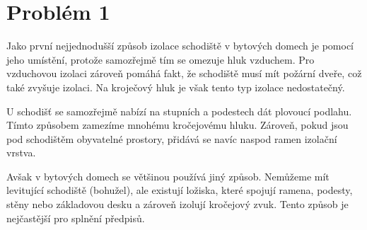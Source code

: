 \documentclass{fkssolpub}
\author{Ondřej Sedláček}
\begin{document}
 

\section{Problém 1}

Jako první nejjednodušší způsob izolace schodiště v bytových domech je
pomocí jeho umístění, protože samozřejmě tím se omezuje hluk vzduchem.
Pro vzduchovou izolaci zároveň pomáhá fakt, že schodiště musí mít
požární dveře, což také zvyšuje izolaci. Na kroječový hluk je však 
tento typ izolace nedostatečný.

U schodišť se samozřejmě nabízí na stupních a podestech dát plovoucí podlahu.
Tímto způsobem zamezíme mnohému kročejovému hluku. Zároveň, pokud jsou pod
schodištěm obyvatelné prostory, přidává se navíc naspod ramen izolační vrstva.

Avšak v bytových domech se většinou používá jiný způsob. Nemůžeme mít
levitující schodiště (bohužel), ale existují ložiska, které spojují ramena,
podesty, stěny nebo základovou desku a zároveň izolují kročejový zvuk.
Tento způsob je nejčastější pro splnění předpisů.
\end{document}
